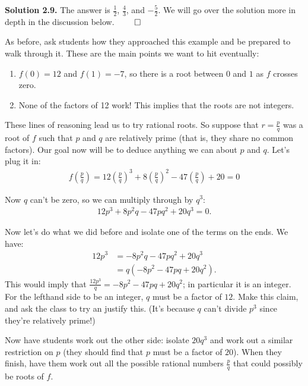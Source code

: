 \textbf{Solution 2.9.} The answer is $\frac12$, $\frac43$, and $-\frac52$. We will go over the solution more in depth in the discussion below. \hspace{\fill} $\qed$

As before, ask students how they approached this example and be prepared to walk through it. These are the main points we want to hit eventually:

\begin{enumerate}
    \item $f(0) = 12$ and $f(1) = -7$, so there is a root between $0$ and $1$ as $f$ crosses zero.
    \item None of the factors of 12 work! This implies that the roots are not integers.
\end{enumerate}

These lines of reasoning lead us to try rational roots. So suppose that $r = \frac{p}{q}$ was a root of $f$ such that $p$ and $q$ are relatively prime (that is, they share no common factors). Our goal now will be to deduce anything we can about $p$ and $q$. Let's plug it in:
\begin{align*}
    f\left(\frac{p}{q}\right) = 12\left(\frac{p}{q}\right)^3 + 8\left(\frac{p}{q}\right)^2 - 47\left(\frac{p}{q}\right) + 20 = 0
\end{align*}

Now $q$ can't be zero, so we can multiply through by $q^3$:
\begin{align*}
    12p^3 + 8p^2q - 47pq^2 + 20q^3 = 0.
\end{align*}

Now let's do what we did before and isolate one of the terms on the ends. We have:
\begin{align*}
    12p^3 &= -8p^2q - 47pq^2 + 20q^3\\
        &= q(-8p^2-47pq+20q^2).
\end{align*}
This would imply that $\frac{12p^3}{q} = -8p^2-47pq + 20q^2$; in particular it is an integer. For the lefthand side to be an integer, $q$ must be a factor of $12$. Make this claim, and ask the class to try an justify this. (It's because $q$ can't divide $p^3$ since they're relatively prime!)

Now have students work out the other side: isolate $20q^3$ and work out a similar restriction on $p$ (they should find that $p$ must be a factor of $20$). When they finish, have them work out all the possible rational numbers $\frac{p}{q}$ that could possibly be roots of $f$.

